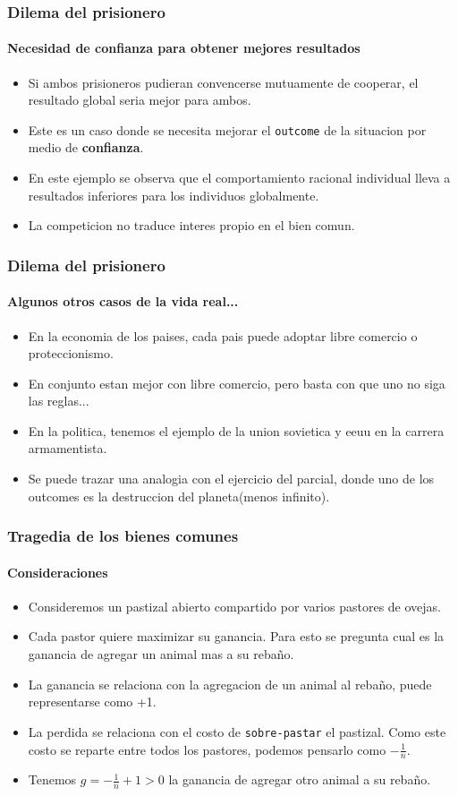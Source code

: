 \documentclass{beamer}
\begin{document}
\begin{frame}
    \frametitle{Dilema del prisionero}
  \framesubtitle{Necesidad de \textbf{confianza} para obtener mejores resultados}
  \begin{itemize}
    \setlength{\itemsep}{4pt}
    \item Si ambos prisioneros pudieran convencerse mutuamente de cooperar, el resultado global seria mejor para ambos.
    \pause
    \item Este es un caso donde se necesita mejorar el \texttt{outcome} de la situacion por medio de \textbf{confianza}.
    \pause 
    \item En este ejemplo se observa que el comportamiento racional individual lleva a resultados inferiores para los individuos globalmente.
    \pause
    \item La competicion no traduce interes propio en el bien comun. 
  \end{itemize}
\end{frame}

\begin{frame}
  \frametitle{Dilema del prisionero}
  \framesubtitle{Algunos otros casos de la vida real...}
  \begin{itemize}
    \setlength{\itemsep}{4pt}
    \item En la economia de los paises, cada pais puede adoptar libre comercio o proteccionismo.
    \pause
    \item En conjunto estan mejor con libre comercio, pero basta con que uno no siga las reglas...
    \pause 
    \item En la politica, tenemos el ejemplo de la union sovietica y eeuu en la carrera armamentista.
    \pause
    \item Se puede trazar una analogia con el ejercicio del parcial, donde uno de los outcomes es la destruccion del planeta(menos infinito).
  \end{itemize}
\end{frame}

\begin{frame}
  \frametitle{Tragedia de los bienes comunes}
  \framesubtitle{Consideraciones}
  \begin{itemize}
    \setlength{\itemsep}{4pt}
    \item Consideremos un pastizal abierto compartido por varios pastores de ovejas.
    \pause
    \item Cada pastor quiere maximizar su ganancia. Para esto se pregunta cual es la ganancia de agregar un animal mas a su rebaño.
    \pause 
    \item La ganancia se relaciona con la agregacion de un animal al rebaño, puede representarse como +1.
    \pause
    \item La perdida se relaciona con el costo de \texttt{sobre-pastar} el pastizal. Como este costo se reparte entre todos los pastores, podemos pensarlo como $-\frac{1}{n}$.
    \pause
    \item Tenemos $ g = -\frac{1}{n} + 1 > 0$ la ganancia de agregar otro animal a su rebaño.
  \end{itemize}
\end{frame}
\end{document}

